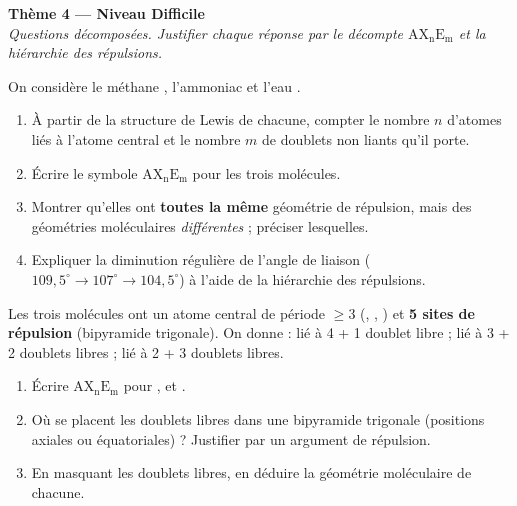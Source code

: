 \documentclass[11pt,a4paper]{article}
\newcommand{\AX}[2]{\ensuremath{\mathrm{AX_{#1}E_{#2}}}}
\begin{document}
\begin{center}
{\Large\bfseries\color{primarydark}Thème 4 — Niveau Difficile}\\[2pt]
{\small\itshape Questions décomposées. Justifier chaque réponse par le décompte \AX{n}{m} et la hiérarchie des répulsions.}
\end{center}
\medskip

\begin{exo}
On considère le méthane , l'ammoniac  et l'eau .
\begin{enumerate}[label=\alph*),leftmargin=2em,itemsep=2pt]
  \item À partir de la structure de Lewis de chacune, compter le nombre $n$ d'atomes liés à l'atome
        central et le nombre $m$ de doublets non liants qu'il porte.
  \item Écrire le symbole \AX{n}{m} pour les trois molécules.
  \item Montrer qu'elles ont \textbf{toutes la même} géométrie de répulsion, mais des géométries
        moléculaires \emph{différentes} ; préciser lesquelles.
  \item Expliquer la diminution régulière de l'angle de liaison
        ($109{,}5^\circ \to 107^\circ \to 104{,}5^\circ$) à l'aide de la hiérarchie des répulsions.
\end{enumerate}
\end{exo}

\begin{exo}
Les trois molécules ont un atome central de période $\geq 3$ (, , ) et
\textbf{5 sites de répulsion} (bipyramide trigonale). On donne :  lié à 4  + 1 doublet
libre ;  lié à 3  + 2 doublets libres ;  lié à 2  + 3 doublets libres.
\begin{enumerate}[label=\alph*),leftmargin=2em,itemsep=2pt]
  \item Écrire \AX{n}{m} pour ,  et .
  \item Où se placent les doublets libres dans une bipyramide trigonale (positions axiales ou
        équatoriales) ? Justifier par un argument de répulsion.
  \item En masquant les doublets libres, en déduire la géométrie moléculaire de chacune.
\end{enumerate}
\end{exo}
\end{document}
